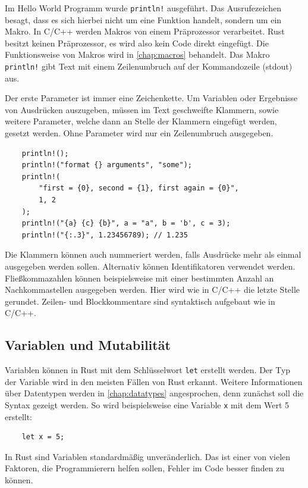 Im Hello World Programm wurde \verb"println!" ausgeführt. Das Ausrufezeichen besagt, dass es sich hierbei nicht um eine Funktion handelt, sondern um ein Makro. In C/C++ werden Makros von einem Präprozessor verarbeitet. Rust besitzt keinen Präprozessor, es wird also kein Code direkt eingefügt. Die Funktionsweise von Makros wird in \autoref{chap:macros} behandelt. Das Makro \verb"println!" gibt Text mit einem Zeilenumbruch auf der Kommandozeile (stdout) aus.

Der erste Parameter ist immer eine Zeichenkette. Um Variablen oder Ergebnisse von Ausdrücken auszugeben, müssen im Text geschweifte Klammern, sowie weitere Parameter, welche dann an Stelle der Klammern eingefügt werden, gesetzt werden. Ohne Parameter wird nur ein Zeilenumbruch ausgegeben.

\begin{lstlisting}
    println!();
    println!("format {} arguments", "some");
    println!(
        "first = {0}, second = {1}, first again = {0}",
        1, 2
    );
    println!("{a} {c} {b}", a = "a", b = 'b', c = 3);
    println!("{:.3}", 1.23456789); // 1.235
\end{lstlisting}

Die Klammern können auch nummeriert werden, falls Ausdrücke mehr als einmal ausgegeben werden sollen. Alternativ können Identifikatoren verwendet werden. Fließkommazahlen können beispielsweise mit einer bestimmten Anzahl an Nachkommastellen ausgegeben werden. Hier wird wie in C/C++ die letzte Stelle gerundet. Zeilen- und Blockkommentare sind syntaktisch aufgebaut wie in C/C++.

\vspace{1cm}
\subsection{Variablen und Mutabilität}

Variablen können in Rust mit dem Schlüsselwort \verb"let" erstellt werden. Der Typ der Variable wird in den meisten Fällen von Rust erkannt. Weitere Informationen über Datentypen werden in \autoref{chap:datatypes} angesprochen, denn zunächst soll die Syntax gezeigt werden. So wird beispielsweise eine Variable \verb"x" mit dem Wert 5 erstellt:

\begin{lstlisting}
    let x = 5;
\end{lstlisting}

In Rust sind Variablen standardmäßig unveränderlich. Das ist einer von vielen Faktoren, die Programmierern helfen sollen, Fehler im Code besser finden zu können. \cite{RustBook}

